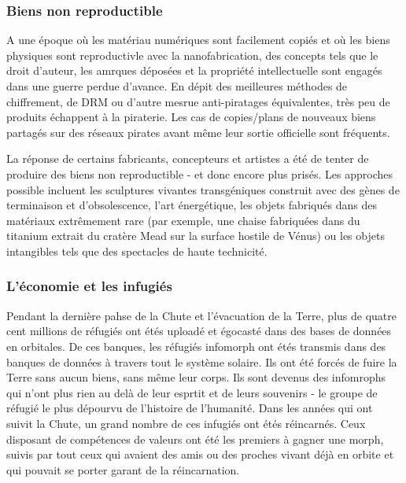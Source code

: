                \subsubsection{Biens non reproductible} \label{sec:irreproducible-goods} 

               A une époque où les matériau numériques sont facilement copiés et où les biens physiques sont reproductivle avec la nanofabrication, des concepts tels que le droit d'auteur, les amrques déposées et la propriété intellectuelle sont engagés dans une guerre perdue d'avance. En dépit des meilleures méthodes de chiffrement, de DRM ou d'autre mesrue anti-piratages équivalentes, très peu de produits échappent à la piraterie. Les cas de copies/plans de nouveaux biens partagés sur des réseaux pirates avant même leur sortie officielle sont fréquents. 

               La réponse de certains fabricants, concepteurs et artistes a été de tenter de produire des biens non reproductible - et donc encore plus prisés. Les approches possible incluent les sculptures vivantes transgéniques construit avec des gènes de terminaison et d'obsolescence, l'art énergétique, les objets fabriqués dans des matériaux extrêmement rare (par exemple, une chaise fabriquées dans du titanium extrait du cratère Mead sur la surface hostile de Vénus) ou les objets intangibles tels que des spectacles de haute technicité. 

               \subsubsection{L'économie et les infugiés} \label{sec:econ-infom-refug} 

               Pendant la dernière pahse de la Chute et l'évacuation de la Terre, plus de quatre cent millions de réfugiés ont étés uploadé et égocasté dans des bases de données en orbitales. De ces banques, les réfugiés infomorph ont étés transmis dans des banques de données à travers tout le système solaire. Ils ont été forcés de fuire la Terre sans aucun biens, sans même leur corps. Ils sont devenus des infomrophs qui n'ont plus rien au delà de leur esprtit et de leurs souvenirs - le groupe de réfugié le plus dépourvu de l'histoire de l'humanité. Dans les années qui ont suivit la Chute, un grand nombre de ces infugiés ont étés réincarnés. Ceux disposant de compétences de valeurs ont été les premiers à gagner une morph, suivis par tout ceux qui avaient des amis ou des proches vivant déjà en orbite et qui pouvait se porter garant de la réincarnation. 


